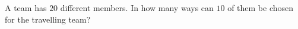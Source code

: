 A team has $20$ different members. In how many ways can $10$ of them be chosen for the travelling team?
